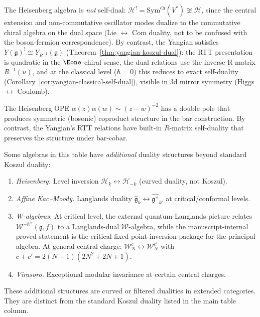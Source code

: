 \begin{remark}\label{rem:heisenberg-yangian-contrast}
The Heisenberg algebra is \emph{not} self-dual: $\mathcal{H}^! = \mathrm{Sym}^{\mathrm{ch}}(V^*) \not\cong \mathcal{H}$, since the central extension and non-commutative oscillator modes dualize to the commutative chiral algebra on the dual space (Lie $\leftrightarrow$ Com duality, not to be confused with the boson-fermion correspondence). By contrast, the Yangian satisfies $Y(\mathfrak{g})^! \cong Y_{R^{-1}}(\mathfrak{g})$ (Theorem~\ref{thm:yangian-koszul-dual}): the RTT presentation is quadratic in the $\Eone$-chiral sense, the dual relations use the inverse R-matrix $R^{-1}(u)$, and at the classical level ($\hbar = 0$) this reduces to exact self-duality (Corollary~\ref{cor:yangian-classical-self-dual}), visible in 3d mirror symmetry (Higgs $\leftrightarrow$ Coulomb).

The Heisenberg OPE $\alpha(z)\alpha(w) \sim (z-w)^{-2}$ has a double pole that produces symmetric (bosonic) coproduct structure in the bar construction. By contrast, the Yangian's RTT relations have built-in $R$-matrix self-duality that preserves the structure under bar-cobar.
\end{remark}

\begin{remark}\label{rem:additional-dualities}
Some algebras in this table have \emph{additional} duality structures beyond standard Koszul duality:

\begin{enumerate}
\item \emph{Heisenberg.} Level inversion $\mathcal{H}_k \leftrightarrow \mathcal{H}_{-k}$ (curved duality, not Koszul).

\item \emph{Affine Kac--Moody.} Langlands duality $\widehat{\mathfrak{g}}_k \leftrightarrow \widehat{\mathfrak{g}^\vee}_{k'}$ at critical/conformal levels.

\item \emph{W-algebras.} At critical level, the external quantum-Langlands picture relates $\mathcal{W}^{-h^\vee}(\mathfrak{g}, f)$ to a Langlands-dual $\mathcal{W}$-algebra, while the manuscript-internal proved statement is the critical fixed-point inversion package for the principal algebra. At general central charge: $\mathcal{W}_N^c \leftrightarrow \mathcal{W}_N^{c'}$ with $c + c' = 2(N-1)(2N^2+2N+1)$.

\item \emph{Virasoro.} Exceptional modular invariance at certain central charges.
\end{enumerate}

These additional structures are curved or filtered dualities in
extended categories. They are distinct from the standard Koszul
duality listed in the main table column.
\end{remark}

